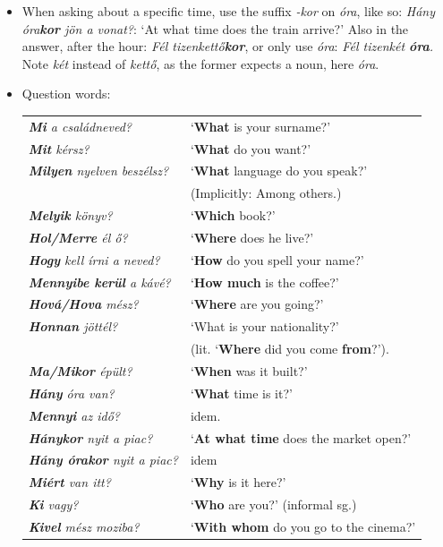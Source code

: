 \documentclass[a4paper,11pt]{article}
\begin{document}
\begin{itemize}
  \item When asking about a specific time, use the suffix \emph{-kor}
    on \emph{óra}, like so: \emph{Hány óra\textbf{kor} jön a vonat?}:
    `At what time does the train arrive?' Also in the answer, after
    the hour: \emph{Fél tizenkettő\textbf{kor}}, or only use
    \emph{óra}: \emph{Fél tizenkét \textbf{óra}.} Note \emph{két}
    instead of \emph{kettő}, as the former expects a noun, here
    \emph{óra}.

  \item Question words:
    \begin{center}
    \begin{tabular}{@{}>{\itshape}ll@{}}
      \textbf{Mi} a családneved? & `\textbf{What} is your surname?'\\
      \textbf{Mit} kérsz? & `\textbf{What} do you want?'\\
      \textbf{Milyen} nyelven beszélsz? & `\textbf{What}
      language do you speak?'\\
      & (Implicitly: Among others.) \\
      \textbf{Melyik} könyv? & `\textbf{Which} book?' \\
      \textbf{Hol/Merre} él ő? & `\textbf{Where} does he live?'\\
      \textbf{Hogy} kell írni a neved? & `\textbf{How} do you spell
      your name?' \\
      \textbf{Mennyibe kerül} a kávé? & `\textbf{How much} is the
      coffee?'\\
      \textbf{Hová/Hova} mész? & `\textbf{Where} are you going?'\\
      \textbf{Honnan} jöttél? & `What is your nationality?'\\
      & (lit. `\textbf{Where} did you come \textbf{from}?').\\
      \textbf{Ma/Mikor} épült? & `\textbf{When} was it built?'\\
      \textbf{Hány} óra van? & `\textbf{What} time is it?'\\
      \textbf{Mennyi} az idő? & idem. \\
      \textbf{Hánykor} nyit a piac? & `\textbf{At what time} does
      the market open?' \\
      \textbf{Hány órakor} nyit a piac? & idem \\
      \textbf{Miért} van itt? & `\textbf{Why} is it here?' \\
      \textbf{Ki} vagy? & `\textbf{Who} are you?' (informal sg.) \\
      \textbf{Kivel} mész moziba? & `\textbf{With whom} do you go to
      the cinema?'
    \end{tabular}
    \end{center}


\end{itemize}
\end{document}
